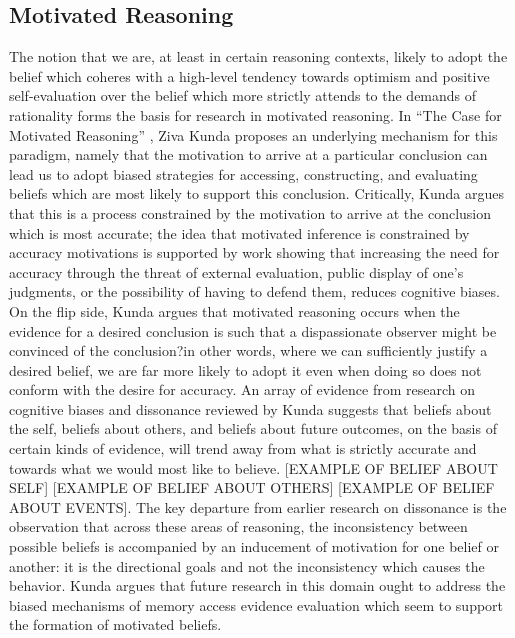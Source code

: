 \documentclass{article}
\begin{document}
\subsection{Motivated Reasoning}
The notion that we are, at least in certain reasoning contexts, likely to adopt the belief which coheres with a high-level tendency towards optimism and positive self-evaluation over the belief which more strictly attends to the demands of rationality forms the basis for research in motivated reasoning. In ``The Case for Motivated Reasoning'' \citet{Kunda1990}, Ziva Kunda proposes an underlying mechanism for this paradigm, namely that the motivation to arrive at a particular conclusion can lead us to adopt biased strategies for accessing, constructing, and evaluating beliefs which are most likely to support this conclusion. Critically, Kunda argues that this is a process constrained by the motivation to arrive at the conclusion which is most accurate; the idea that motivated inference is constrained by accuracy motivations is supported by work showing that increasing the need for accuracy through the threat of external evaluation, public display of one's judgments, or the possibility of having to defend them, reduces cognitive biases. On the flip side, Kunda argues that motivated reasoning occurs when the evidence for a desired conclusion is such that a dispassionate observer might be convinced of the conclusion?in other words, where we can sufficiently justify a desired belief, we are far more likely to adopt it even when doing so does not conform with the desire for accuracy. An array of evidence from research on cognitive biases and dissonance reviewed by Kunda suggests that beliefs about the self, beliefs about others, and beliefs about future outcomes, on the basis of certain kinds of evidence, will trend away from what is strictly accurate and towards what we would most like to believe. [EXAMPLE OF BELIEF ABOUT SELF] [EXAMPLE OF BELIEF ABOUT OTHERS] [EXAMPLE OF BELIEF ABOUT EVENTS]. The key departure from earlier research on dissonance is the observation that across these areas of reasoning, the inconsistency between possible beliefs is accompanied by an inducement of motivation for one belief or another: it is the directional goals and not the inconsistency which causes the behavior. Kunda argues that future research in this domain ought to address the biased mechanisms of memory access evidence evaluation which seem to support the formation of motivated beliefs. 
\end{document}
